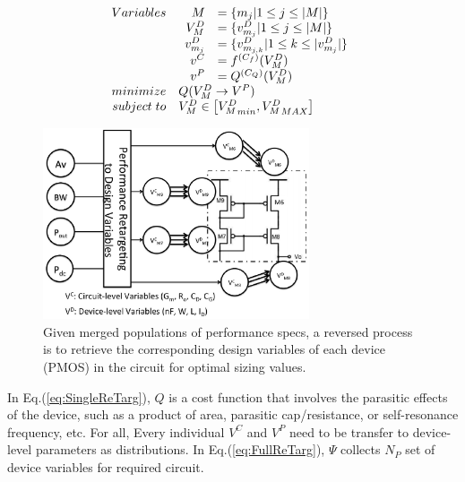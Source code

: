     \begin{align}{\label{eq:SingleReTarg}}
      \begin{array}[t]{rl}
        Variables & \begin{array}[t]{rl}
                      M         &= \{ m_j| 1 \leq j \leq |M|\} \\
                      V^D_M     &= \{ v^D_{m_j} | 1 \leq j \leq |M|\} \\
                      v^D_{m_j} &= \{v^D_{m_{j,k}}| 1 \leq k \leq |v^D_{m_j}|\}\\
                      v^C       &= f^{(C_f)}(V^D_M)\\
                      v^P       &= Q^{(C_Q)}(V^D_M)\\
                    \end{array} \\
         minimize & Q(V^D_M \to V^P)  \\
       subject\; to & V^D_M\in \left [{V^D_M}_{min}, {V^D_M}_{MAX} \right] 
      \end{array} 
    \end{align}

    \begin{figure}[t]
      \centering
      \includegraphics[width=0.7\textwidth]{Fig/Chapter2/Retarg.eps}
      \caption{Given merged populations of performance specs, a reversed process is to retrieve the corresponding design variables of each device (PMOS) in the circuit for optimal sizing values.} 
      \label{fig:Retarg}
    \end{figure}
    
    In Eq.(\ref{eq:SingleReTarg}), $Q$ is a cost function that involves the parasitic effects of the device, such as a product of area, parasitic cap/resistance, or self-resonance frequency, etc. For all, Every individual $V^C$ and $V^P$ need to be transfer to device-level parameters as distributions. In Eq.(\ref{eq:FullReTarg}), $\Psi$ collects $N_P$ set of device variables for required circuit.

